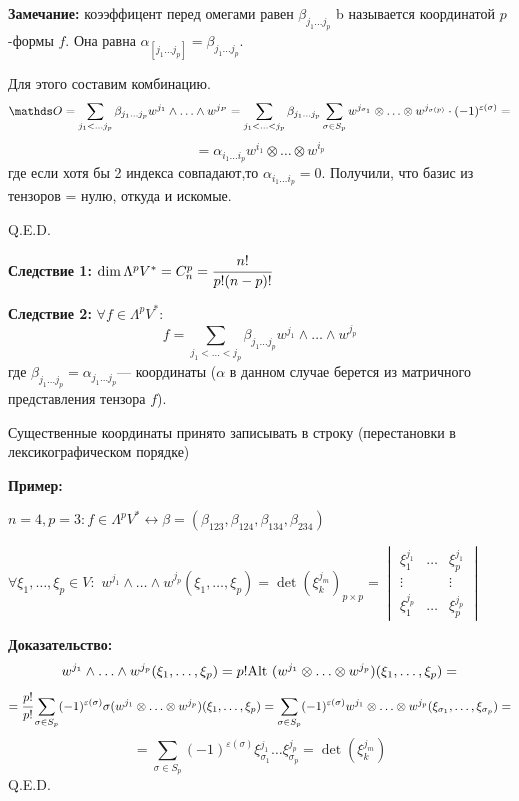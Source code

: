 \textbf{Замечание:} коээффицент перед омегами равен $\beta_{j_1\ldots j_p}$ b называется  координатой $p$-формы $f$.  Она равна $\alpha_{[j_1\ldots j_p]}=\beta_{j_1\ldots j_p}$.


Для этого составим комбинацию.
$$\zero=\sum\limits_{j_1 <\ldots j_p}\beta_{j_1\ldots j_p} w^{j_1}\wedge \ldots \wedge w^{j_P}=
\sum\limits_{j_1 < \ldots <j_p} \beta_{j_1\ldots j_p}\sum_{\sigma \in S_p} w^{j_{\sigma_1}}\otimes\ldots\otimes w^{j_{\sigma(p)}} \cdot (-1)^{\varepsilon(\sigma)} = $$
$$= \alpha_{i_1\ldots i_p} w^{i_1}\otimes \ldots \otimes w^{i_p}$$
где если хотя бы 2 индекса совпадают,то $\alpha_{i_1\ldots i_p} = 0$. Получили, что базис из тензоров = нулю, откуда и искомые.

\hfill Q.E.D.

\textbf{Следствие 1:} $\dim \Lambda^pV^* = C^p_n = \cfrac{n!}{p!(n-p)!}$

\textbf{Следствие 2:} $\forall f \in \Lambda^p V^*:$
$$f = \sum\limits_{j_1<\ldots <j_p} \beta_{j_1\ldots j_p}w^{j_1}\wedge \ldots \wedge w^{j_p}$$
где $\beta_{j_1\ldots j_p} = \alpha_{j_1\ldots j_p}$---
 координаты ($\alpha$ в данном случае берется из матричного представления тензора $f$).



Существенные координаты принято записывать в строку
(перестановки в лексикографическом порядке)

\textbf{Пример:}

$n=4, p=3: f\in \Lambda^{p}V^* \leftrightarrow \beta = (\beta_{123},\beta_{124},\beta_{134}, \beta_{234})$


$\forall \xi_1,\ldots, \xi_p \in V:$ $w^{j_1}\wedge \ldots \wedge w^{j_p} (\xi_1,\ldots,\xi_p) = \det(\xi^{j_m}_k)_{p\times p} = \begin{vmatrix}
    \xi_1^{j_1} & \ldots & \xi_p^{j_1}\\
    \vdots & & \vdots \\
    \xi_1^{j_p} & \ldots & \xi_p^{j_p}
\end{vmatrix}$

\textbf{Доказательство:}
$$w^{j_1}\wedge \ldots \wedge w^{j_p} (\xi_1,\ldots,\xi_p) = p! \text{Alt } (w^{j_1}\otimes \ldots  \otimes w^{j_p})(\xi_1,\ldots,\xi_p) =$$
$$=\cfrac{p!}{p!} \sum\limits_{\sigma \in S_p}(-1)^{\varepsilon(\sigma)}\sigma(w^{j_1}\otimes \ldots \otimes w^{j_p})(\xi_1,\ldots,\xi_p) = \sum_{\sigma \in S_p} (-1)^{\varepsilon(\sigma)}w^{j_1}\otimes \ldots \otimes w^{j_p}(\xi_{\sigma_1},\ldots ,\xi_{\sigma_p}) = $$
$$= \sum\limits_{\sigma\in S_p}(-1)^{\varepsilon(\sigma)}\xi_{\sigma_1}^{j_1}\ldots \xi_{\sigma_p}^{j_p} = \det(\xi_k^{j_m})$$
\hfill Q.E.D.


